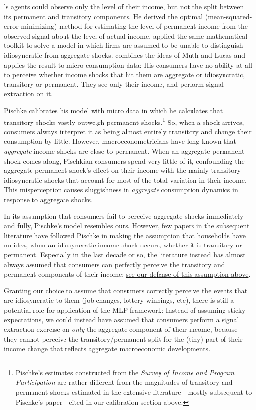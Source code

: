 \documentclass[titlepage]{./econtex}
\begin{document}
\cite{muthOptimal}'s agents could observe only the level of their income, but not the split between its permanent and transitory components.  He derived the optimal (mean-squared-error-minimizing) method for estimating the level of permanent income from the observed signal about the level of actual income.  \cite{lucas:imperfectInfo} applied the same mathematical toolkit to solve a model in which firms are assumed to be unable to distinguish idiosyncratic from aggregate shocks.  \cite{pischkeMicroMacro} combines the ideas of Muth and Lucas and applies the result to micro consumption data: His consumers have no ability at all to perceive whether income shocks that hit them are aggregate or idiosyncratic, transitory or permanent.  They see only their income, and perform signal extraction on it.

Pischke calibrates his model with micro data in which he calculates that transitory shocks vastly outweigh permanent shocks.\footnote{Pischke's estimates constructed from the {\it Survey of Income and Program Participation} are rather different from the magnitudes of transitory and permanent shocks estimated in the extensive literature---mostly subsequent to Pischke's paper---cited in our calibration section above.}  So, when a shock arrives, consumers always interpret it as being almost entirely transitory and change their consumption by little.  However, macroeconometricians have long known that {\it aggregate} income shocks are close to permanent.  When an aggregate permanent shock comes along, Pischkian consumers spend very little of it, confounding the aggregate permanent shock's effect on their income with the mainly transitory idiosyncratic shocks that account for most of the total variation in their income.  This misperception causes sluggishness in {\it aggregate} consumption dynamics in response to aggregate shocks.

In its assumption that consumers fail to perceive aggregate shocks immediately and fully, Pischke's model resembles ours.  However, few papers in the subsequent literature have followed Pischke in making the assumption that households have no idea, when an idiosyncratic income shock occurs, whether it is transitory or permanent.  Especially in the last decade or so, the literature instead has almost always assumed that consumers can perfectly perceive the transitory and permanent components of their income; \hyperlink{Why-Consumers-See-Individual-Shocks}{see our defense of this assumption above}.

Granting our choice to assume that consumers correctly perceive the events that are idiosyncratic to them (job changes, lottery winnings, etc), there is still a potential role for application of the MLP framework:  Instead of assuming sticky expectations, we could instead have assumed that consumers perform a signal extraction exercise on \textit{only} the aggregate component of their income, because they cannot perceive the transitory/permanent split for the (tiny) part of their income change that reflects aggregate macroeconomic developments.
\end{document}
